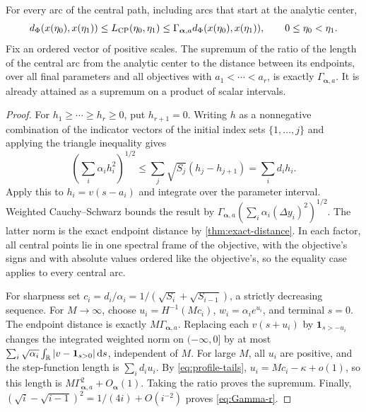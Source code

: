 \begin{theorem}
\label{thm:sharp-prefix}
For every arc of the central path, including arcs that start at the
analytic center,
\begin{equation}
 d_\Phi(x(\eta_0),x(\eta_1))
 \leq L_{\mathrm{CP}}(\eta_0,\eta_1)
 \leq\Gamma_{\boldsymbol\alpha,a}
           d_\Phi(x(\eta_0),x(\eta_1)),\qquad 0\leq\eta_0<\eta_1.
 \label{eq:sharp-prefix}
\end{equation}
Fix an ordered vector of positive scales. The supremum of the ratio of
the length of the central arc from the analytic center to the distance
between its endpoints, over all final parameters and all objectives
with $a_1<\cdots<a_r$, is exactly
$\Gamma_{\boldsymbol\alpha,a}$. It is already attained as a supremum
on a product of scalar intervals.
\end{theorem}
\begin{proof}
For $h_1\geq\cdots\geq h_r\geq0$, put $h_{r+1}=0$. Writing $h$ as a
nonnegative combination of the indicator vectors of the initial index
sets $\{1,\ldots,j\}$ and applying the triangle inequality gives
\begin{equation}
 \left(\sum_i\alpha_ih_i^2\right)^{1/2}
 \leq\sum_j\sqrt{S_j}(h_j-h_{j+1})=\sum_i d_ih_i.
 \label{eq:prefix-inequality}
\end{equation}
Apply this to $h_i=v(s-a_i)$ and integrate over the parameter interval.
Weighted Cauchy--Schwarz bounds the result by
$\Gamma_{\boldsymbol\alpha,a}(\sum_i\alpha_i(\Delta y_i)^2)^{1/2}$.
The latter norm is the exact endpoint distance by
\cref{thm:exact-distance}. In each factor, all central points lie in
one spectral frame of the objective, with the objective's signs and with
absolute values ordered like the objective's, so the equality case
applies to every central arc.

For sharpness set
$c_i=d_i/\alpha_i=1/(\sqrt{S_i}+\sqrt{S_{i-1}})$, a strictly decreasing
sequence. For $M\to\infty$, choose $u_i=H^{-1}(Mc_i)$,
$w_i=\alpha_i e^{u_i}$, and terminal $s=0$. The endpoint distance is
exactly $M\Gamma_{\boldsymbol\alpha,a}$. Replacing each
$v(s+u_i)$ by $\mathbf1_{s>-u_i}$ changes the integrated weighted norm
on $(-\infty,0]$ by at most
$\sum_i\sqrt{\alpha_i}\int_\mathbb R|v-\mathbf1_{s>0}|\,\mathrm d s$, independent
of $M$. For large $M$, all $u_i$ are positive, and the step-function
length is $\sum_i d_iu_i$. By \eqref{eq:profile-tails},
$u_i=Mc_i-\kappa+o(1)$, so this length is
$M\Gamma_{\boldsymbol\alpha,a}^2+O_{\boldsymbol\alpha}(1)$.
Taking the ratio proves the supremum. Finally,
$(\sqrt i-\sqrt{i-1})^2=1/(4i)+O(i^{-2})$ proves
\eqref{eq:Gamma-r}.
\end{proof}

